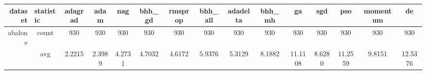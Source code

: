 \begin{table}[H]
{\begin{tabular}{rcccc|c|c|c|c|c|ccccc}
			\cmidrule{3-3}\cmidrule{6-6}\cmidrule{8-8}\cmidrule{10-10}    \textbf{dataset} & \multicolumn{1}{l}{\textbf{statistic}} & \textbf{adagrad}                                                                   & \textbf{adam}                                                             & \textbf{nag}                                                              & \textbf{bhh\_gd}                               & \textbf{rmsprop}                                                          & \textbf{bhh\_all}                            & \textbf{adadelta}                           & \textbf{bhh\_mh}                               & \textbf{ga}                                    & \textbf{sgd}                                    & \textbf{pso}                                    & \textbf{momentum}                              & \textbf{de}                                    \\
			\midrule
			abalone                                                                        & count                                  & 930                                                                                & 930                                                                       & 930                                                                       & 930                                            & 930                                                                       & 930                                          & 930                                         & 930                                            & 930                                            & 930                                             & 930                                             & 930                                            & 930                                            \\
			                                                                               & avg                                    & \cellcolor[rgb]{ .776,  .937,  .808}\textcolor[rgb]{ 0,  .38,  0}{2.2215}          & 2.3989                                                                    & 4.2731                                                                    & 4.7032                                         & 4.6172                                                                    & 5.9376                                       & 5.3129                                      & 8.1882                                         & 11.1108                                        & 8.6280                                          & 11.2559                                         & 9.8151                                         & 12.5376                                        \\

\end{tabular}}
\end{table}

